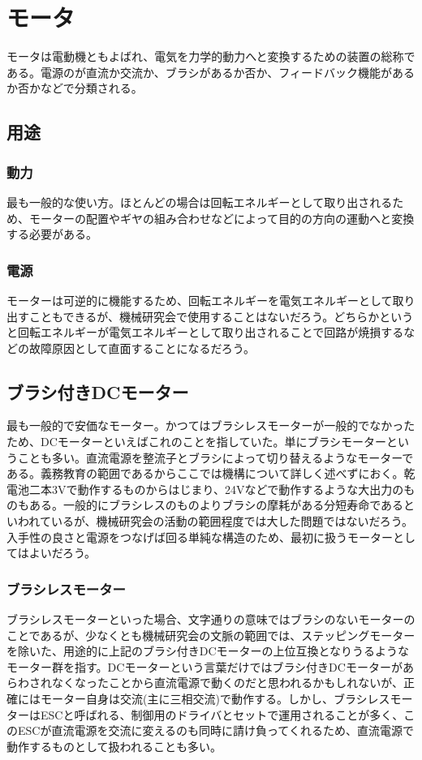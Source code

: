 \documentclass[a4paper,titlepage,here]{ujarticle}
\begin{document}
\section{モータ}
モータは電動機ともよばれ、電気を力学的動力へと変換するための装置の総称である。電源のが直流か交流か、ブラシがあるか否か、フィードバック機能があるか否かなどで分類される。
\subsection{用途}
\subsubsection{動力}
最も一般的な使い方。ほとんどの場合は回転エネルギーとして取り出されるため、モーターの配置やギヤの組み合わせなどによって目的の方向の運動へと変換する必要がある。
\subsubsection{電源}
モーターは可逆的に機能するため、回転エネルギーを電気エネルギーとして取り出すこともできるが、機械研究会で使用することはないだろう。どちらかというと回転エネルギーが電気エネルギーとして取り出されることで回路が焼損するなどの故障原因として直面することになるだろう。
\subsection{ブラシ付きDCモーター}
最も一般的で安価なモーター。かつてはブラシレスモーターが一般的でなかったため、DCモーターといえばこれのことを指していた。単にブラシモーターということも多い。直流電源を整流子とブラシによって切り替えるようなモーターである。義務教育の範囲であるからここでは機構について詳しく述べずにおく。乾電池二本3Vで動作するものからはじまり、24Vなどで動作するような大出力のものもある。一般的にブラシレスのものよりブラシの摩耗がある分短寿命であるといわれているが、機械研究会の活動の範囲程度では大した問題ではないだろう。入手性の良さと電源をつなげば回る単純な構造のため、最初に扱うモーターとしてはよいだろう。
\subsubsection{ブラシレスモーター}
ブラシレスモーターといった場合、文字通りの意味ではブラシのないモーターのことであるが、少なくとも機械研究会の文脈の範囲では、ステッピングモーターを除いた、用途的に上記のブラシ付きDCモーターの上位互換となりうるようなモーター群を指す。DCモーターという言葉だけではブラシ付きDCモーターがあらわされなくなったことから直流電源で動くのだと思われるかもしれないが、正確にはモーター自身は交流(主に三相交流)で動作する。しかし、ブラシレスモーターはESCと呼ばれる、制御用のドライバとセットで運用されることが多く、このESCが直流電源を交流に変えるのも同時に請け負ってくれるため、直流電源で動作するものとして扱われることも多い。
\end{document}
